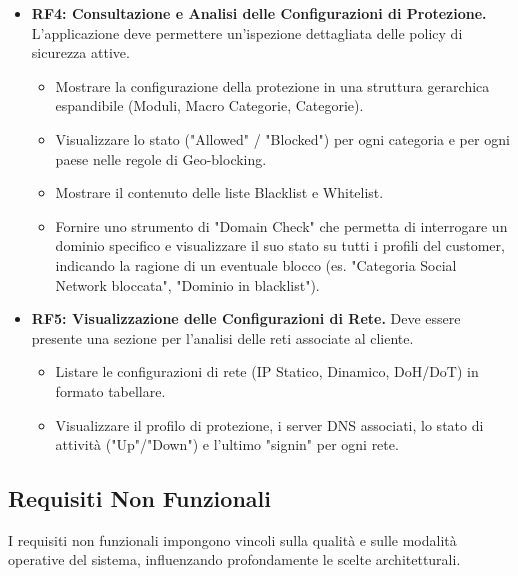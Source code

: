 \documentclass[12pt,a4paper,openright,twoside]{book}
\begin{document}
\begin{itemize}
    \item \textbf{RF4: Consultazione e Analisi delle Configurazioni di Protezione.} L'applicazione deve permettere un'ispezione dettagliata delle policy di sicurezza attive.
          \begin{itemize}
              \item Mostrare la configurazione della protezione in una struttura gerarchica espandibile (Moduli, Macro Categorie, Categorie).
              \item Visualizzare lo stato ("Allowed" / "Blocked") per ogni categoria e per ogni paese nelle regole di Geo-blocking.
              \item Mostrare il contenuto delle liste Blacklist e Whitelist.
              \item Fornire uno strumento di "Domain Check" che permetta di interrogare un dominio specifico e visualizzare il suo stato su tutti i profili del customer, indicando la ragione di un eventuale blocco (es. "Categoria Social Network bloccata", "Dominio in blacklist").
          \end{itemize}

    \item \textbf{RF5: Visualizzazione delle Configurazioni di Rete.} Deve essere presente una sezione per l'analisi delle reti associate al cliente.
          \begin{itemize}
              \item Listare le configurazioni di rete (IP Statico, Dinamico, DoH/DoT) in formato tabellare.
              \item Visualizzare il profilo di protezione, i server DNS associati, lo stato di attività ("Up"/"Down") e l'ultimo "signin" per ogni rete.
          \end{itemize}
\end{itemize}

\subsection{Requisiti Non Funzionali}
\label{subsec:req_non_funzionali}
I requisiti non funzionali impongono vincoli sulla qualità e sulle modalità operative del sistema, influenzando profondamente le scelte architetturali.
\end{document}
